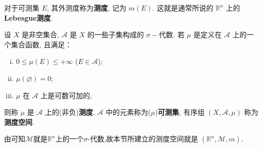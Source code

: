 \documentclass[../../main.tex]{subfiles}
\begin{document}
\begin{definition}[Lebesgue测度]
对于可测集 \(E\), 其外测度称为\textbf{测度}, 记为 \(m(E)\). 这就是通常所说的 \(\mathbb{R}^n\) 上的 \textbf{Lebesgue测度}.
\end{definition}

\begin{definition}[测度]
设 \(X\) 是非空集合, \(\mathscr{A}\) 是 \(X\) 的一些子集构成的 \(\sigma -\)代数. 若 \(\mu\) 是定义在 \(\mathscr{A}\) 上的一个集合函数, 且满足：
\begin{enumerate}[(i)]
\item \(0 \leqslant  \mu(E) \leqslant  +\infty\) (\(E \in \mathscr{A}\));
\item \(\mu(\varnothing)=0\);
\item \(\mu\) 在 \(\mathscr{A}\) 上是可数可加的,
\end{enumerate}
则称 \(\mu\) 是 \(\mathscr{A}\) 上的(非负)\textbf{测度}. \(\mathscr{A}\) 中的元素称为(\(\mu\))\textbf{可测集}, 有序组 \((X, \mathscr{A}, \mu)\) 称为\textbf{测度空间}. 
\end{definition}
\begin{remark}
由可知$\mathscr{M}$就是$\mathbb{R}^n$上的一个$\sigma$-代数,故本节所建立的测度空间就是 \((\mathbb{R}^n, \mathscr{M}, m)\). 
\end{remark}
\end{document}
